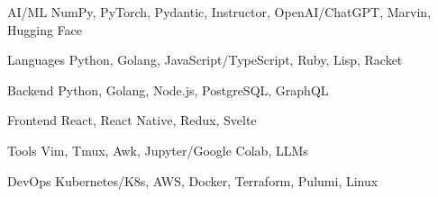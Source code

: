 

\begin{cvskills}
  \cvskill
    {AI/ML} %
    {NumPy, PyTorch, Pydantic, Instructor, OpenAI/ChatGPT, Marvin, Hugging Face} %

  \cvskill
    {Languages} %
    {Python, Golang, JavaScript/TypeScript, Ruby, Lisp, Racket} %

  \cvskill
    {Backend} %
    {Python, Golang, Node.js, PostgreSQL, GraphQL} %

  \cvskill
    {Frontend} %
    {React, React Native, Redux, Svelte} %

  \cvskill
    {Tools} %
    {Vim, Tmux, Awk, Jupyter/Google Colab, LLMs} %

  \cvskill
    {DevOps} %
    {Kubernetes/K8s, AWS, Docker, Terraform, Pulumi, Linux} %


\end{cvskills}
